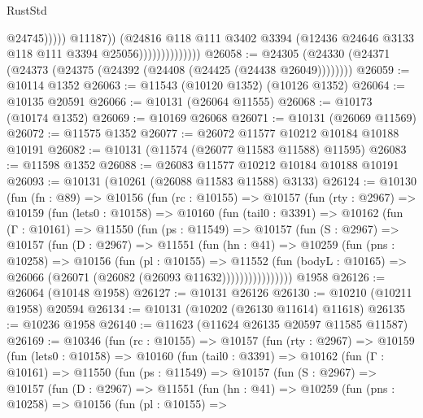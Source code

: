 \begin{lexlean}{RustStd}
\begin{coremodule}
                                          @24745)))))
                                @11187))
                            (@24816
                              @118
                              @111
                              @3402
                              @3394
                              (@12436 @24646 @3133 @118 @111 @3394 @25056))))))))))))))
@26058 := @24305 (@24330 (@24371 (@24373 (@24375 (@24392 (@24408 (@24425 (@24438 @26049))))))))
@26059 := @10114 @1352
@26063 := @11543 (@10120 @1352) (@10126 @1352)
@26064 := @10135 @20591
@26066 := @10131 (@26064 @11555)
@26068 := @10173 (@10174 @1352)
@26069 := @10169 @26068
@26071 := @10131 (@26069 @11569)
@26072 := @11575 @1352
@26077 := @26072 @11577 @10212 @10184 @10188 @10191
@26082 := @10131 (@11574 (@26077 @11583 @11588) @11595)
@26083 := @11598 @1352
@26088 := @26083 @11577 @10212 @10184 @10188 @10191
@26093 := @10131 (@10261 (@26088 @11583 @11588) @3133)
@26124 := @10130
    (fun (fn : @89) =>
    @10156
      (fun (rc : @10155) =>
      @10157
        (fun (rty : @2967) =>
        @10159
          (fun (lets0 : @10158) =>
          @10160
            (fun (tail0 : @3391) =>
            @10162
              (fun (Γ : @10161) =>
              @11550
                (fun (ps : @11549) =>
                @10157
                  (fun (S : @2967) =>
                  @10157
                    (fun (D : @2967) =>
                    @11551
                      (fun (hn : @41) =>
                      @10259
                        (fun (pns : @10258) =>
                        @10156
                          (fun (pl : @10155) =>
                          @11552
                            (fun (bodyL : @10165) =>
                            @26066 (@26071 (@26082 (@26093 @11632))))))))))))))))
    @1958
@26126 := @26064 (@10148 @1958)
@26127 := @10131 @26126
@26130 := @10210 (@10211 @1958) @20594
@26134 := @10131 (@10202 (@26130 @11614) @11618)
@26135 := @10236 @1958
@26140 := @11623 (@11624 @26135 @20597 @11585 @11587)
@26169 := @10346
    (fun (rc : @10155) =>
    @10157
      (fun (rty : @2967) =>
      @10159
        (fun (lets0 : @10158) =>
        @10160
          (fun (tail0 : @3391) =>
          @10162
            (fun (Γ : @10161) =>
            @11550
              (fun (ps : @11549) =>
              @10157
                (fun (S : @2967) =>
                @10157
                  (fun (D : @2967) =>
                  @11551
                    (fun (hn : @41) =>
                    @10259
                      (fun (pns : @10258) =>
                      @10156
                        (fun (pl : @10155) =>

\end{coremodule}
\end{lexlean}
